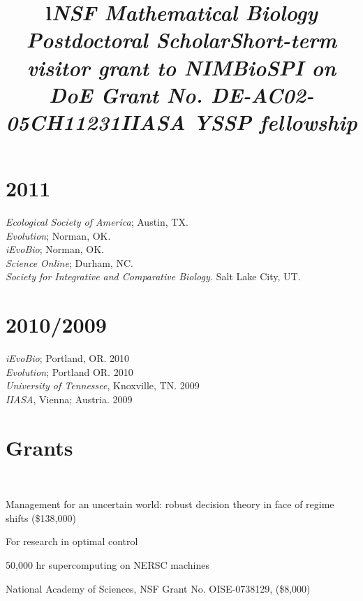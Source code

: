 \documentclass[margin]{res}
\begin{document}
\begin{resume}
\section{\textnormal{2011}}
  \emph{Ecological Society of America}; Austin, TX. \\
  \emph{Evolution}; Norman, OK. \\
  \emph{iEvoBio}; Norman, OK. \\
  \emph{Science Online}; Durham, NC.\\
  \emph{Society for Integrative and Comparative Biology.} Salt Lake City, UT. \\
 \section{\textnormal{2010/2009}}
  \emph{iEvoBio}; Portland, OR. 2010 \\
  \emph{Evolution}; Portland OR. 2010 \\
 \emph{University of Tennessee}, Knoxville, TN. 2009 \\
 \emph{IIASA}, Vienna; Austria. 2009

\section{Grants}
\begin{format}
\title{l} \\
\body
\end{format}

\title{\emph{NSF Mathematical Biology Postdoctoral Scholar}}
\begin{position}
Management for an uncertain world: robust decision theory in face of regime shifts (\$138,000)
  \vspace{-.25cm}
\end{position}

\title{\emph{Short-term visitor grant to NIMBioS}}
\begin{position}
  For research in optimal control
  \vspace{-.25cm}
\end{position}

\title{\emph{PI on DoE Grant No. DE-AC02-05CH11231}}
\begin{position} 
50,000 hr supercomputing on NERSC machines
  \vspace{-.25cm}
\end{position}

\title{\emph{IIASA YSSP fellowship}}
\begin{position} 
  National Academy of Sciences, NSF Grant No. OISE-0738129, (\$8,000)
  \vspace{-.25cm}
\end{position}


\end{resume}
\end{document}
